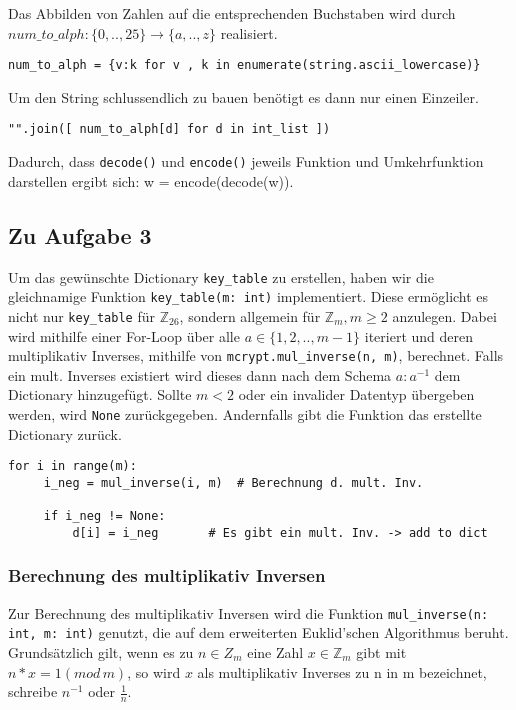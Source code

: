 \documentclass[12pt]{article}
\begin{document}
Das Abbilden von Zahlen auf die entsprechenden Buchstaben wird durch $num\_to\_alph: \{0,..,25\} \to \{a,..,z\}$ realisiert.
\begin{lstlisting}
num_to_alph = {v:k for v , k in enumerate(string.ascii_lowercase)}
\end{lstlisting}

Um den String schlussendlich zu bauen benötigt es dann nur einen Einzeiler.
\begin{lstlisting}
"".join([ num_to_alph[d] for d in int_list ])
\end{lstlisting}

Dadurch, dass \texttt{decode()} und \texttt{encode()} jeweils Funktion und Umkehrfunktion darstellen ergibt sich: w = encode(decode(w)).


\subsection{Zu Aufgabe 3}
Um das gewünschte Dictionary \texttt{key\_table} zu erstellen, haben wir die gleichnamige Funktion \texttt{key\_table(m: int)} implementiert. Diese ermöglicht es nicht nur \texttt{key\_table} für $\mathbb{Z}_{26}$, sondern allgemein für $\mathbb{Z}_{m},  m \geq 2$ anzulegen. Dabei wird mithilfe einer For-Loop über alle $ a \in \{1,2,..,m-1\}$ iteriert und deren multiplikativ Inverses, mithilfe von \texttt{mcrypt.mul\_inverse(n, m)}, berechnet. Falls ein mult. Inverses existiert wird dieses dann nach dem Schema \texttt{$a:a^{-1}$} dem Dictionary hinzugefügt. Sollte $m < 2$ oder ein invalider Datentyp übergeben werden, wird \texttt{None} zurückgegeben. Andernfalls gibt die Funktion das erstellte Dictionary zurück. 
\begin{lstlisting}
for i in range(m):
     i_neg = mul_inverse(i, m)	# Berechnung d. mult. Inv.
 	
     if i_neg != None:
         d[i] = i_neg		# Es gibt ein mult. Inv. -> add to dict
\end{lstlisting}

\subsubsection{Berechnung des multiplikativ Inversen}
Zur Berechnung des multiplikativ Inversen wird die Funktion \texttt{mul\_inverse(n: int, m: int)} genutzt, die auf dem erweiterten Euklid'schen Algorithmus beruht. Grundsätzlich gilt, wenn es zu $n \in Z_{m}$ eine Zahl $x \in \mathbb{Z}_{m}$ gibt mit $n * x = 1 (mod \, m)$, so wird $x$ als multiplikativ Inverses zu n in m bezeichnet, schreibe $n^{-1}$ oder $\frac{1}{n}$.
\end{document}
